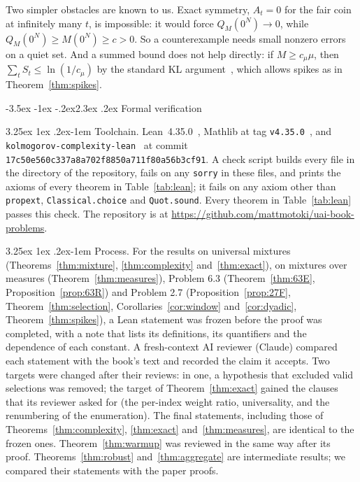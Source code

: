 \documentclass[11pt]{article}
\makeatletter
\renewcommand\section{\@startsection{section}{1}{\z@}%
  {-3.5ex \@plus -1ex \@minus -.2ex}{2.3ex \@plus.2ex}%
  {\normalfont\Large\bfseries\boldmath}}
\renewcommand\paragraph{\@startsection{paragraph}{4}{\z@}%
  {3.25ex \@plus1ex \@minus.2ex}{-1em}%
  {\normalfont\normalsize\bfseries\boldmath}}
\newcommand{\repourl}{\url{https://github.com/mattmotoki/uai-book-problems}}
\theoremstyle{definition}
\theoremstyle{remark}
\makeatother
\begin{document}
Two simpler obstacles are known to us. Exact symmetry, $A_t=0$ for the fair
coin at infinitely many $t$, is impossible: it would force
$Q_M(0^N)\to0$, while $Q_M(0^N)\ge M(0^N)\ge c>0$. So a counterexample needs
small nonzero errors on a quiet set. And a summed bound does not help
directly: if $M\ge c_\mu\mu$, then $\sum_tS_t\le\ln(1/c_\mu)$ by the standard KL
argument~\cite{hutter2003tit}, which allows spikes as in
Theorem~\ref{thm:spikes}.

\section{Formal verification}\label{sec:formal}

\paragraph{Toolchain.}
Lean~4.35.0~\cite{lean4}, Mathlib at tag \texttt{v4.35.0}~\cite{mathlib2020},
and \texttt{kolmogorov-complexity-lean}~\cite{milovanovlean} at commit
\texttt{17c50e560c337a8a702f8850a711f80a56b3cf91}. A check script builds every
file in the directory  of the repository, fails on any
\texttt{sorry} in these files, and prints the axioms of every theorem in
Table~\ref{tab:lean}; it fails on any axiom other than \texttt{propext},
\texttt{Classical.choice} and \texttt{Quot.sound}. Every theorem in
Table~\ref{tab:lean} passes this check.
The repository is at \repourl.

\paragraph{Process.}
For the results on universal mixtures (Theorems~\ref{thm:mixture},
\ref{thm:complexity} and~\ref{thm:exact}), on mixtures over measures
(Theorem~\ref{thm:measures}), Problem 6.3 (Theorem~\ref{thm:63E},
Proposition~\ref{prop:63R}) and Problem 2.7 (Proposition~\ref{prop:27F},
Theorem~\ref{thm:selection}, Corollaries~\ref{cor:window}
and~\ref{cor:dyadic}, Theorem~\ref{thm:spikes}), a Lean statement was frozen
before the proof was completed, with a note that lists its definitions, its
quantifiers and the dependence of each constant. A fresh-context AI reviewer
(Claude) compared each statement with the book's text and recorded the claim it
accepts. Two targets were changed after their reviews: in one, a hypothesis
that excluded valid selections was removed; the target of
Theorem~\ref{thm:exact} gained the clauses that its reviewer asked for (the
per-index weight ratio, universality, and the renumbering of the enumeration).
The final statements, including those of Theorems~\ref{thm:complexity},
\ref{thm:exact} and~\ref{thm:measures}, are identical to the frozen ones. Theorem~\ref{thm:warmup} was reviewed in the same way after its
proof. Theorems~\ref{thm:robust} and~\ref{thm:aggregate} are intermediate
results; we compared their statements with the paper proofs.
\end{document}
